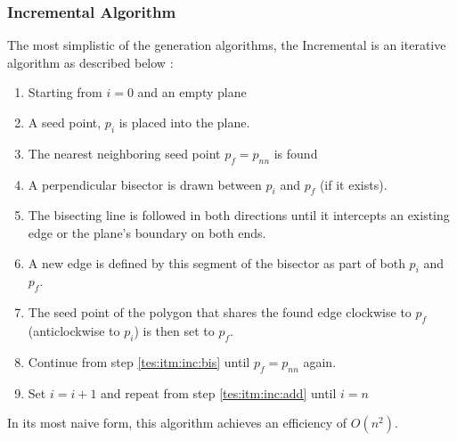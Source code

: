 \subsubsection{Incremental Algorithm}\label{tes:ssec:inc}
The most simplistic of the generation algorithms, the Incremental is an iterative algorithm as described below \citep{green1978computing} \citep{okabe2009spatial}:
\begin{enumerate}
\item Starting from $i=0$ and an empty plane
\item\label{tes:itm:inc:add} A seed point, $p_i$ is placed into the plane.
\item The nearest neighboring seed point $p_f=p_{nn}$ is found
\item\label{tes:itm:inc:bis} A perpendicular bisector is drawn between $p_i$ and $p_f$ (if it exists).
\item The bisecting line is followed in both directions until it intercepts an existing edge or the plane's boundary on both ends.
\item A new edge is defined by this segment of the bisector as part of both $p_i$ and $p_f$.
\item The seed point of the polygon that shares the found edge clockwise to $p_f$ (anticlockwise to $p_i$) is then set to $p_f$.
\item Continue from step \ref{tes:itm:inc:bis} until $p_f=p_{nn}$ again.
\item Set $i = i +1$ and repeat from step \ref{tes:itm:inc:add} until $i=n$
\end{enumerate}
In its most naive form, this algorithm achieves an efficiency of $O(n^2)$.
%
